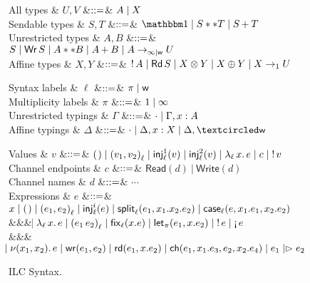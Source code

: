 \begin{figure*}[t]
  \centering
  \begin{minipage}{.58\textwidth}
    \centering
    \begin{grammar}
        All types
      & $U, V$
        &$\bnfas$& $A \bnfalt X$
      \\
      Sendable types
      & $S, T$
      &$\bnfas$& $\tyUnit \bnfalt S ** T \bnfalt \tySum{S}{}{T}$
      \\
      Unrestricted types
      & $A,B$
      &$\bnfas$& $S \bnfalt \tyWr{S} \bnfalt A ** B \bnfalt \tySum{A}{}{B}
      \bnfalt \tyArr{A}{\infty \mid \wm}{U}$
      \\
      Affine types
      & $X,Y$
      &$\bnfas$& $\tyBang{A} \bnfalt \tyRd{S} \bnfalt \tyTensor{X}{Y} \bnfalt
      \tyOplus{X}{Y} \bnfalt \tyArr{X}{1}{U}$
    \end{grammar}      
  \end{minipage}%
  \begin{minipage}{.42\textwidth}
    \centering
    \begin{grammar}
      Syntax labels
      & $\ell$
      &$\bnfas$& $\pi \bnfalt \wm$      
      \\      
      Multiplicity labels
      & $\pi$
      &$\bnfas$& $1 \bnfalt \infty$      
      \\
      Unrestricted typings
      & $\Gamma$
      &$\bnfas$& $\emptyctxt \bnfalt \Gamma,x:A$
      \\
      Affine typings
      & $\Delta$
      &$\bnfas$& $\emptyctxt \bnfalt \Delta,x:X \bnfalt \Delta, \wrtok$
    \end{grammar}    
  \end{minipage}
  \begin{grammar}
    Values
    & $v$
    &$\bnfas$&
    $\eUnit \bnfalt \ePair{v_1}{v_2}{\ell} \bnfalt \eInjj{\ell}{1}{v} \bnfalt
    \eInjj{\ell}{2}{v} \bnfalt \eLamm{\ell}{x}{e} \bnfalt c \bnfalt \eBang{v}$
    \\
    Channel endpoints & $c$   &$\bnfas$& $\mathsf{Read}(d) ~|~ \mathsf{Write}(d)$
    \\
    Channel names & $d$ &$\bnfas$& $\cdots$
    \\      
    Expressions
    & $e$
    &$\bnfas$&
    $\eVar{x} \bnfalt \eUnit \bnfalt \ePair{e_1}{e_2}{\ell} \bnfalt \eInjj{\ell}{i}{e}
    \bnfalt \eSplitt{\ell}{e_1}{x_1}{x_2}{e_2} \bnfalt
    \eCase{\ell}{e}{x_1}{e_1}{x_2}{e_2}$
    \\ &&& $\bnfaltbrk \eLamm{\ell}{x}{e} \bnfalt \eApp{e_1}{e_2}{\ell} \bnfalt \eFixx{\ell}{x}{e}
    \bnfalt \eLet{x}{e_1}{e_2} \bnfalt \eBang{e} \bnfalt \eUnbang{e}$
    \\ &&& $\bnfaltbrk \eNu{(x_1,x_2)}{e} \bnfalt \eWr{e_1}{e_2} \bnfalt
    \eLetRd{e_1}{x}{e_2} \bnfalt \eChoicee{e_1}{x_1}{e_3}{e_2}{x_2}{e_4} \bnfalt
    \eFork{e_1}{e_2}$
  \end{grammar}      
  \caption{ILC Syntax.}
  \label{fig:ilc-syntax}
\end{figure*}
